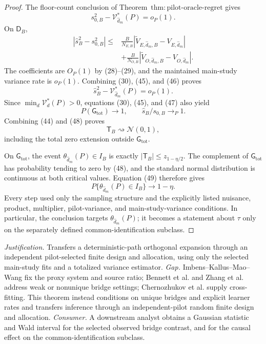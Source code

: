 \documentclass{article}
\begin{document}
\begin{proof}
The floor-count conclusion of Theorem~\(\mathrm{thm{:}pilot\text{-}oracle\text{-}regret}\) gives
\[
 s_{0,B}^2-\mathcal V_{\widehat d_m}^*(P)=o_P(1).             \tag{45}
\]
On \(\mathsf D_B\),
\[
\begin{aligned}
 |\widehat s_B^2-s_{0,B}^2|
 \le{}&\frac{B}{N_{E,B}}
 |\widetilde V_{E,\widehat d_m,B}-V_{E,\widehat d_m}|\\
 &+\frac{B}{N_{O,B}}
 |\widetilde V_{O,\widehat d_m,B}-V_{O,\widehat d_m}|.      \tag{46}
\end{aligned}
\]
The coefficients are \(O_P(1)\) by (28)--(29), and the maintained main-study variance rate is \(o_P(1)\).  Combining (30), (45), and (46) proves
\[
 \widehat s_B^2-\mathcal V_{\widehat d_m}^*(P)=o_P(1).        \tag{47}
\]
Since \(\min_d\mathcal V_d^*(P)>0\), equations (30), (45), and (47) also yield
\[
 P(\mathsf G_{\mathrm{tot}})\longrightarrow1,
 \qquad \widehat s_B/s_{0,B}\longrightarrow_P1.             \tag{48}
\]
Combining (44) and (48) proves
\[
 \mathsf T_B\rightsquigarrow\mathcal N(0,1),                \tag{49}
\]
including the total zero extension outside \(\mathsf G_{\mathrm{tot}}\).

On \(\mathsf G_{\mathrm{tot}}\), the event \(\theta_{\widehat d_m}(P)\in I_B\) is exactly \(|\mathsf T_B|\le z_{1-\eta/2}\).  The complement of \(\mathsf G_{\mathrm{tot}}\) has probability tending to zero by (48), and the standard normal distribution is continuous at both critical values.  Equation (49) therefore gives
\[
 P\{\theta_{\widehat d_m}(P)\in I_B\}\longrightarrow1-\eta.
\]
Every step used only the sampling structure and the explicitly listed nuisance, product, multiplier, pilot-variance, and main-study-variance conditions.  In particular, the conclusion targets \(\theta_{\widehat d_m}(P)\); it becomes a statement about \(\tau\) only on the separately defined common-identification subclass.
\end{proof}
\par\smallskip\noindent \textit{Justification.} Transfers a deterministic-path orthogonal expansion through an independent pilot-selected finite design and allocation, using only the selected main-study fits and a totalized variance estimator. \textit{Gap.} Imbens--Kallus--Mao--Wang fix the proxy system and source ratio; Bennett et al. and Zhang et al. address weak or nonunique bridge settings; Chernozhukov et al. supply cross-fitting. This theorem instead conditions on unique bridges and explicit learner rates and transfers inference through an independent-pilot random finite design and allocation. \textit{Consumer.} A downstream analyst obtains a Gaussian statistic and Wald interval for the selected observed bridge contrast, and for the causal effect on the common-identification subclass.
\end{document}
